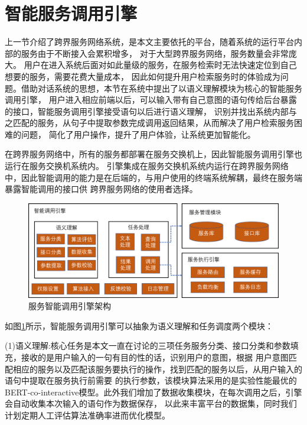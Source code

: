   
\section{智能服务调用引擎}

上一节介绍了跨界服务网络系统，是本文主要依托的平台，随着系统的运行平台内部的服务由于不断接入会累积增多，
对于大型跨界服务网络，服务数量会非常庞大。
用户在进入系统后面对如此量级的服务，在服务检索时无法快速定位到自己想要的服务，需要花费大量成本，
因此如何提升用户检索服务时的体验成为问题。借助对话系统的思想，本节在系统中提出了以语义理解模块为核心的智能服务调用引擎，
用户进入相应前端以后，可以输入带有自己意图的语句传给后台暴露的接口，智能服务调用引擎接受语句以后进行语义理解，
识别并找出系统内部与之匹配的服务，从句子中提取参数完成调用返回结果，从而解决了用户检索服务困难的问题，
简化了用户操作，提升了用户体验，让系统更加智能化。

在跨界服务网络中，所有的服务都部署在服务交换机上，因此智能服务调用引擎也运行在服务交换机系统内。
引擎集成在服务交换机系统内运行在跨界服务网络中，因此智能调用的能力是在后端的，与用户使用的终端系统解耦，最终在服务端暴露智能调用的接口供
跨界服务网络的使用者选择。

\begin{figure}[htbp]
  \centering
  \includegraphics[width=15cm]{./images/yinqing.png}
  \caption{服务智能调用引擎架构}
  \label{fig:yinqing}
\end{figure}

如图\ref{fig:yinqing}所示，智能服务调用引擎可以抽象为语义理解和任务调度两个模块：

(1)语义理解:核心任务是本文一直在讨论的三项任务服务分类、接口分类和参数填充，接收的是用户输入的一句有目的性的话，识别用户的意图，根据
用户意图匹配相应的服务以及匹配该服务要执行的操作，找到匹配的服务以后，从用户输入的语句中提取在服务执行前需要
的执行参数，该模块算法采用的是实验性能最优的BERT-co-interactive模型。此外我们增加了数据收集模块，在每次调用之后，引擎会自动收集本次输入的语句作为数据保存，
以此来丰富平台的数据集，同时我们计划定期人工评估算法准确率进而优化模型。

